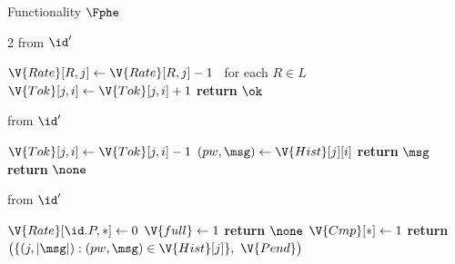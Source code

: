 \begin{interface}[nofloat]{Functionality $\Fphe$ \\
}
{\begin{multicols}{2}
 \quad from $\id'$
\begin{algorithmic}[1]
\algcont
{}
 \label{ln:pheguessgate}
  \State $\V{Rate}[R, j] \gets \V{Rate}[R, j] - 1$ \ for each $R \in L$ \label{ln:pheguessspend}
\EndIf
\State $\V{Tok}[j, i] \gets \V{Tok}[j, i] + 1$ \label{ln:phetokenmint}
\State \textbf{return} $\ok$
\algsave
\end{algorithmic}
\vspace{1.4ex}

 \quad from $\id'$
\begin{algorithmic}[1]
\algcont
{} \label{ln:phetokenspend}
\State $\V{Tok}[j, i] \gets \V{Tok}[j, i] - 1$
\State $(pw, \msg) \gets \V{Hist}[j][i]$
  \State \textbf{return} $\msg$ \label{ln:pheguesswin}
\EndIf
\State \textbf{return} $\none$ \label{ln:pheguesslose}
\algsave
\end{algorithmic}
\vspace{1.4ex}

 \quad from $\id'$
\begin{algorithmic}[1]
\algcont
{}
  \State $\V{Rate}[\id.P, *] \gets 0$ \label{ln:pherlreset}
\EndIf
{}
  \State $\V{full} \gets 1$ \label{ln:phefull}
\EndIf
{}
  \State \textbf{return} $\none$ \label{ln:pheleakrl}
\EndIf
\State $\V{Cmp}[*] \gets 1$ \label{ln:phecmpall}
\State \textbf{return} $\bigl(\{(j, |\msg|) : (pw, \msg) \in \V{Hist}[j]\},\ \V{Pend}\bigr)$ \label{ln:pheleakserver}
\algsave
\end{algorithmic}
\end{multicols}}
\end{interface}
